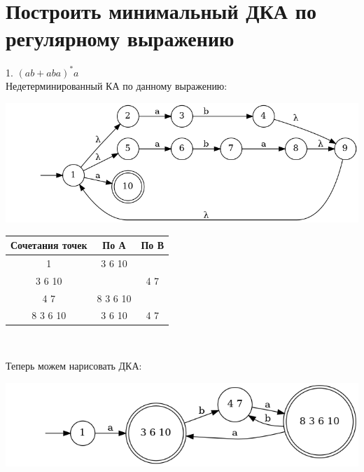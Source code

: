 \documentclass{article}
\begin{document}
\section{Построить минимальный ДКА по регулярному выражению}
    1. $(ab+aba)^*a$\\
    Недетерминированный КА по данному выражению:
    \begin{center}
        \includegraphics[width=1\textwidth]{pic3_1_1.dot}\\
    \end{center}
    \begin{center}
        \begin{tabular}{|c|c|c|}
            \hline
            Сочетания точек & По А & По В \\
            \hline
            1 & 3 6 10 & \\
            3 6 10 & & 4 7 \\
            4 7 & 8 3 6 10 & \\
            8 3 6 10 & 3 6 10 & 4 7\\
            \hline
        \end{tabular}\\
    \end{center}
    Теперь можем нарисовать ДКА:
    \begin{center}
        \includegraphics[width=1\textwidth]{pic3_1_2.dot}\\
    \end{center}
    
\end{document}
